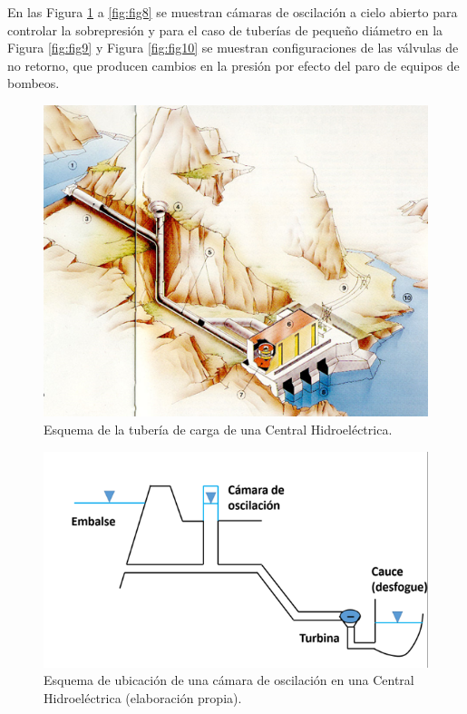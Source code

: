 \documentclass[letterpaper]{report}
\begin{document}
En las Figura \ref{fig:fig2} a \ref{fig:fig8} se muestran cámaras de oscilación a cielo abierto para controlar la sobrepresión y 
para el caso de tuberías de pequeño diámetro en la Figura \ref{fig:fig9} y Figura \ref{fig:fig10} se muestran configuraciones de las 
válvulas de no retorno, que producen cambios en la presión por efecto del paro de equipos de bombeos.
\begin{figure}[H]
	\centering
	\includegraphics[width=.65\linewidth]{fig2}
	\caption{Esquema de la tubería de carga de una Central Hidroeléctrica.}
	\label{fig:fig2}
\end{figure}

\begin{figure}[H]
	\centering
	\includegraphics[width=0.65\linewidth]{fig3}
	\caption{Esquema de ubicación de una cámara de oscilación en una Central Hidroeléctrica (elaboración propia).}
	\label{fig:fig3}
\end{figure}
\end{document}
